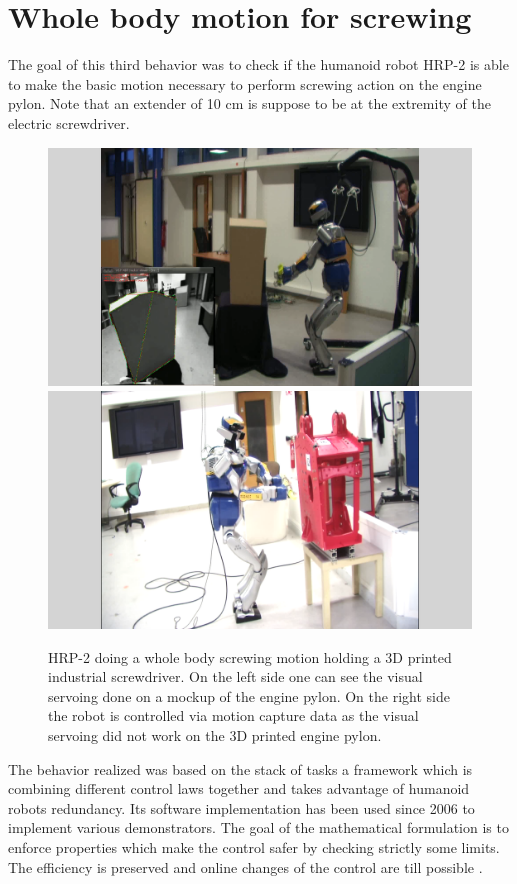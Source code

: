 \section{Whole body motion for screwing}

The goal of this third behavior was to check if the humanoid robot HRP-2  is able to make the basic motion necessary to perform screwing action on the engine pylon. 
Note that an extender of 10 cm is suppose to be at the extremity of the electric screwdriver.

\begin{figure}
  \begin{center}
    \includegraphics[clip=true, keepaspectratio, height=0.28\linewidth, trim={6.5cm 0cm 6.5cm 0cm}]{figures/engine_pylon_mockup.png}\hfill
    \includegraphics[clip=true, keepaspectratio, height=0.28\linewidth, trim={6.5cm 0cm 6.5cm 0cm}]{figures/whole_body_motion_engine_pylon.png}        
  \end{center}
  \caption{HRP-2 doing a whole body screwing motion holding a 3D printed industrial screwdriver. On the left side one can see the visual servoing done on a mockup of the engine pylon. On the right side the robot is controlled via motion capture data as the visual servoing did not work on the 3D printed engine pylon.}
  \label{fig:whole:body:motion:screwing}
\end{figure}

The behavior realized was based on the stack of tasks \cite{mansard:icar:09} a framework which is combining different control laws together 
and takes advantage of humanoid robots redundancy. Its software implementation has been used since 2006 to implement various demonstrators. 
The goal of the mathematical formulation is to enforce properties which make the control safer by checking strictly some limits.
The efficiency is preserved and online changes of the control are till possible \cite{escande-ijrr-14}. 

